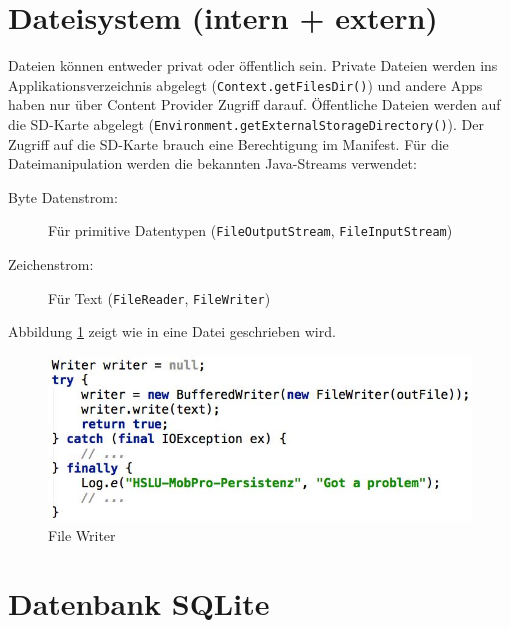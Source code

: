 \section{Dateisystem (intern + extern)}

Dateien können entweder privat oder öffentlich sein. Private Dateien werden ins Applikationsverzeichnis abgelegt (\texttt{Context.getFilesDir()}) und andere Apps haben nur über Content Provider Zugriff darauf. Öffentliche Dateien werden auf die SD-Karte abgelegt (\texttt{Environment.getExternalStorageDirectory()}). Der Zugriff auf die SD-Karte brauch eine Berechtigung im Manifest.
Für die Dateimanipulation werden die bekannten Java-Streams verwendet:
\begin{description}
	\item[Byte Datenstrom:] Für primitive Datentypen (\texttt{FileOutputStream}, \texttt{FileInputStream})
	\item[Zeichenstrom:] Für Text (\texttt{FileReader}, \texttt{FileWriter})
\end{description}
Abbildung \ref{fig:file-writer} zeigt wie in eine Datei geschrieben wird.
\begin{figure}
\centering
\includegraphics[width=\linewidth]{fig/file-writer}
\caption{File Writer}
\label{fig:file-writer}
\end{figure}

\section{Datenbank SQLite}

